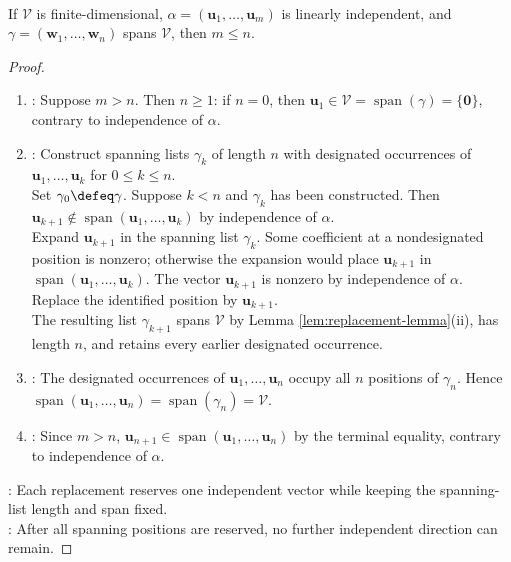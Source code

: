 \begin{theorem} \label{thm:finitedimlenofvec} \\
If $\mathcal{V}$ is finite-dimensional, $\alpha=(\mathbf{u}_1,\ldots,\mathbf{u}_m)$ is linearly independent, and $\gamma=(\mathbf{w}_1,\ldots,\mathbf{w}_n)$ spans $\mathcal{V}$, then $m\leq n$.
\begin{proof}
\begin{enumerate}[label=(\roman*)]
\setlength{\itemsep}{0pt}
\item {}: Suppose $m>n$. Then $n\geq1$: if $n=0$, then $\mathbf{u}_1\in\mathcal{V}=\operatorname{span}(\gamma)=\{\mathbf{0}\}$, contrary to independence of $\alpha$.
\item {}: Construct spanning lists $\gamma_k$ of length $n$ with designated occurrences of $\mathbf{u}_1,\ldots,\mathbf{u}_k$ for $0\leq k\leq n$.\\
Set $\gamma_0\defeq\gamma$. Suppose $k<n$ and $\gamma_k$ has been constructed. Then $\mathbf{u}_{k+1}\notin\operatorname{span}(\mathbf{u}_1,\ldots,\mathbf{u}_k)$ by independence of $\alpha$.\\
Expand $\mathbf{u}_{k+1}$ in the spanning list $\gamma_k$. Some coefficient at a nondesignated position is nonzero; otherwise the expansion would place $\mathbf{u}_{k+1}$ in $\operatorname{span}(\mathbf{u}_1,\ldots,\mathbf{u}_k)$. The vector $\mathbf{u}_{k+1}$ is nonzero by independence of $\alpha$. Replace the identified position by $\mathbf{u}_{k+1}$.\\
The resulting list $\gamma_{k+1}$ spans $\mathcal{V}$ by Lemma \ref{lem:replacement-lemma}(ii), has length $n$, and retains every earlier designated occurrence.
\item {}: The designated occurrences of $\mathbf{u}_1,\ldots,\mathbf{u}_n$ occupy all $n$ positions of $\gamma_n$. Hence $\operatorname{span}(\mathbf{u}_1,\ldots,\mathbf{u}_n)=\operatorname{span}(\gamma_n)=\mathcal{V}$.
\item {}: Since $m>n$, $\mathbf{u}_{n+1}\in\operatorname{span}(\mathbf{u}_1,\ldots,\mathbf{u}_n)$ by the terminal equality, contrary to independence of $\alpha$.
\end{enumerate}
: Each replacement reserves one independent vector while keeping the spanning-list length and span fixed.\\
: After all spanning positions are reserved, no further independent direction can remain.
\end{proof}
\end{theorem}

